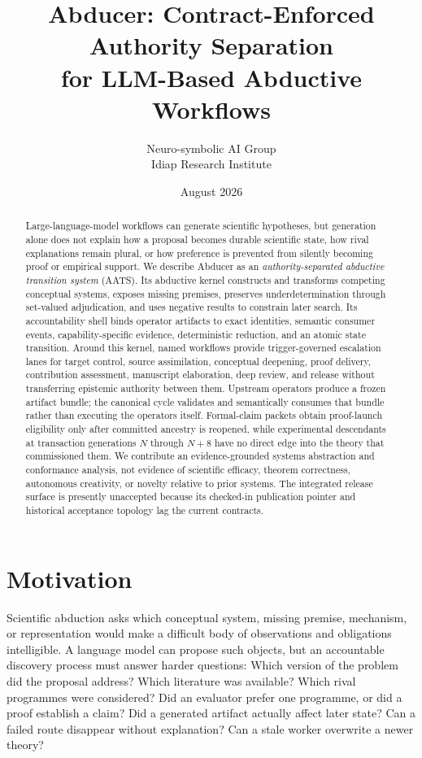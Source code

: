 \documentclass[11pt]{article}
\title{Abducer: Contract-Enforced Authority Separation\\for LLM-Based Abductive Workflows}
\author{Neuro-symbolic AI Group\\Idiap Research Institute}
\date{August 2026}
\begin{document}
\maketitle

\begin{abstract}
Large-language-model workflows can generate scientific hypotheses, but generation alone does not explain how a proposal becomes durable scientific state, how rival explanations remain plural, or how preference is prevented from silently becoming proof or empirical support. We describe Abducer as an \emph{authority-separated abductive transition system} (AATS). Its abductive kernel constructs and transforms competing conceptual systems, exposes missing premises, preserves underdetermination through set-valued adjudication, and uses negative results to constrain later search. Its accountability shell binds operator artifacts to exact identities, semantic consumer events, capability-specific evidence, deterministic reduction, and an atomic state transition. Around this kernel, named workflows provide trigger-governed escalation lanes for target control, source assimilation, conceptual deepening, proof delivery, contribution assessment, manuscript elaboration, deep review, and release without transferring epistemic authority between them. Upstream operators produce a frozen artifact bundle; the canonical cycle validates and semantically consumes that bundle rather than executing the operators itself. Formal-claim packets obtain proof-launch eligibility only after committed ancestry is reopened, while experimental descendants at transaction generations $N$ through $N+8$ have no direct edge into the theory that commissioned them. We contribute an evidence-grounded systems abstraction and conformance analysis, not evidence of scientific efficacy, theorem correctness, autonomous creativity, or novelty relative to prior systems. The integrated release surface is presently unaccepted because its checked-in publication pointer and historical acceptance topology lag the current contracts.
\end{abstract}

\section{Motivation}

Scientific abduction asks which conceptual system, missing premise, mechanism, or representation would make a difficult body of observations and obligations intelligible. A language model can propose such objects, but an accountable discovery process must answer harder questions: Which version of the problem did the proposal address? Which literature was available? Which rival programmes were considered? Did an evaluator prefer one programme, or did a proof establish a claim? Did a generated artifact actually affect later state? Can a failed route disappear without explanation? Can a stale worker overwrite a newer theory?
\end{document}
